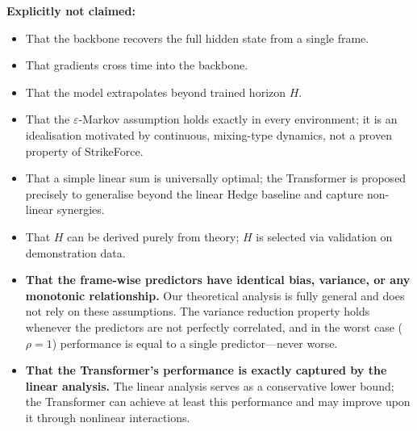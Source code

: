 \documentclass[11pt]{article}
\begin{document}
\textbf{Explicitly not claimed:}
\begin{itemize}
    \item That the backbone recovers the full hidden state from a single frame.
    \item That gradients cross time into the backbone.
    \item That the model extrapolates beyond trained horizon \(H\).
    \item That the \(\varepsilon\)-Markov assumption holds exactly in every environment; it is an idealisation motivated by continuous, mixing-type dynamics, not a proven property of StrikeForce.
    \item That a simple linear sum is universally optimal; the Transformer is proposed precisely to generalise beyond the linear Hedge baseline and capture non-linear synergies.
    \item That \(H\) can be derived purely from theory; \(H\) is selected via validation on demonstration data.
    \item \textbf{That the frame-wise predictors have identical bias, variance, or any monotonic relationship.} Our theoretical analysis is fully general and does not rely on these assumptions. The variance reduction property holds whenever the predictors are not perfectly correlated, and in the worst case (\(\rho=1\)) performance is equal to a single predictor—never worse.
    \item \textbf{That the Transformer's performance is exactly captured by the linear analysis.} The linear analysis serves as a conservative lower bound; the Transformer can achieve at least this performance and may improve upon it through nonlinear interactions.
\end{itemize}
\end{document}
